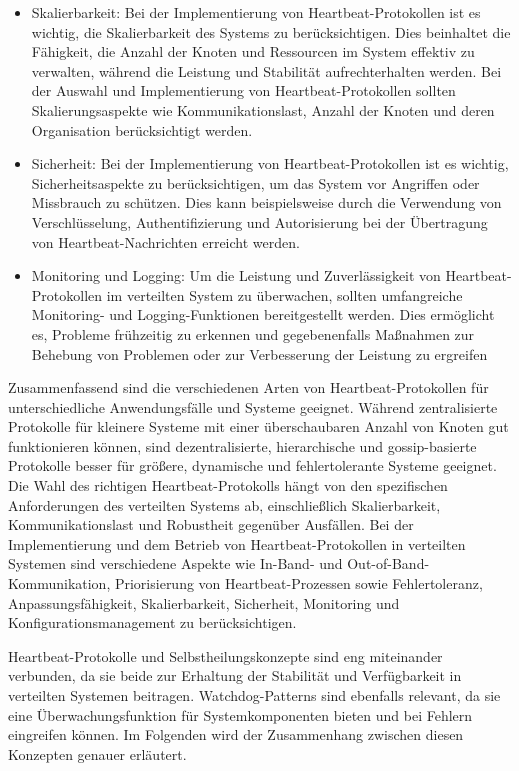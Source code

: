 \begin{itemize}
\item Skalierbarkeit: Bei der Implementierung von Heartbeat-Protokollen ist es wichtig, die Skalierbarkeit des Systems zu berücksichtigen. Dies beinhaltet die Fähigkeit, die Anzahl der Knoten und Ressourcen im System effektiv zu verwalten, während die Leistung und Stabilität aufrechterhalten werden. Bei der Auswahl und Implementierung von Heartbeat-Protokollen sollten Skalierungsaspekte wie Kommunikationslast, Anzahl der Knoten und deren Organisation berücksichtigt werden.
\item Sicherheit: Bei der Implementierung von Heartbeat-Protokollen ist es wichtig, Sicherheitsaspekte zu berücksichtigen, um das System vor Angriffen oder Missbrauch zu schützen. Dies kann beispielsweise durch die Verwendung von Verschlüsselung, Authentifizierung und Autorisierung bei der Übertragung von Heartbeat-Nachrichten erreicht werden.
\item Monitoring und Logging: Um die Leistung und Zuverlässigkeit von Heartbeat-Protokollen im verteilten System zu überwachen, sollten umfangreiche Monitoring- und Logging-Funktionen bereitgestellt werden. Dies ermöglicht es, Probleme frühzeitig zu erkennen und gegebenenfalls Maßnahmen zur Behebung von Problemen oder zur Verbesserung der Leistung zu ergreifen
\end{itemize} 

Zusammenfassend sind die verschiedenen Arten von Heartbeat-Protokollen für unterschiedliche Anwendungsfälle und Systeme geeignet. Während zentralisierte Protokolle für kleinere Systeme mit einer überschaubaren Anzahl von Knoten gut funktionieren können, sind dezentralisierte, hierarchische und gossip-basierte Protokolle besser für größere, dynamische und fehlertolerante Systeme geeignet. Die Wahl des richtigen Heartbeat-Protokolls hängt von den spezifischen Anforderungen des verteilten Systems ab, einschließlich Skalierbarkeit, Kommunikationslast und Robustheit gegenüber Ausfällen. Bei der Implementierung und dem Betrieb von Heartbeat-Protokollen in verteilten Systemen sind verschiedene Aspekte wie In-Band- und Out-of-Band-Kommunikation, Priorisierung von Heartbeat-Prozessen sowie Fehlertoleranz, Anpassungsfähigkeit, Skalierbarkeit, Sicherheit, Monitoring und Konfigurationsmanagement zu berücksichtigen. 


Heartbeat-Protokolle und Selbstheilungskonzepte sind eng miteinander verbunden, da sie beide zur Erhaltung der Stabilität und Verfügbarkeit in verteilten Systemen beitragen. Watchdog-Patterns sind ebenfalls relevant, da sie eine Überwachungsfunktion für Systemkomponenten bieten und bei Fehlern eingreifen können. Im Folgenden wird der Zusammenhang zwischen diesen Konzepten genauer erläutert.

